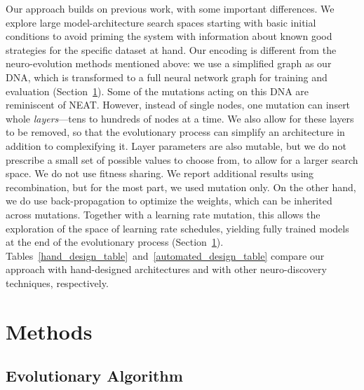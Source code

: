 \documentclass{article}
\begin{document}
Our approach builds on previous work, with some important differences. We explore large model-architecture search spaces starting with basic initial conditions to avoid priming the system with information about known good strategies for the specific dataset at hand. Our encoding is different from the neuro-evolution methods mentioned above: we use a simplified graph as our DNA, which is transformed to a full neural network graph for training and evaluation (Section~\ref{methods_section}). Some of the mutations acting on this DNA are reminiscent of NEAT. However, instead of single nodes, one mutation can insert whole {\em layers}---\ie tens to hundreds of nodes at a time. We also allow for these layers to be removed, so that the evolutionary process can simplify an architecture in addition to complexifying it. Layer parameters are also mutable, but we do not prescribe a small set of possible values to choose from, to allow for a larger search space. We do not use fitness sharing. We report additional results using recombination, but for the most part, we used mutation only. On the other hand, we do use back-propagation to optimize the weights, which can be inherited across mutations. Together with a learning rate mutation, this allows the exploration of the space of learning rate schedules, yielding fully trained models at the end of the evolutionary process (Section~\ref{methods_section}). Tables~\ref{hand_design_table}~and~\ref{automated_design_table} compare our approach with hand-designed architectures and with other neuro-discovery techniques, respectively.


\section{Methods}
\label{methods_section}

\subsection{Evolutionary Algorithm}
\label{evolutionary_algorithm_section}
\end{document}

